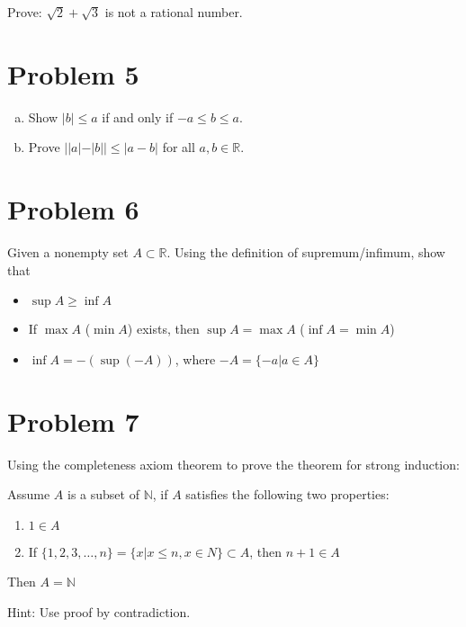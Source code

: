\documentclass[10pt]{article}
\begin{document}
    Prove: $\sqrt 2 + \sqrt 3$ is not a rational number.

    \pagebreak 
    \section*{Problem 5}
    \begin{enumerate}[(a)]
        \item Show $|b| \le a$ if and only if $-a \le b \le a$. 
        \item Prove $||a| - |b|| \le |a - b|$ for all $a, b \in \mathbb R$.
    \end{enumerate}

    \pagebreak

    \section*{Problem 6}

    Given a nonempty set $A \subset \mathbb R$. Using the definition of supremum/infimum, show that 

    \begin{itemize}
        \item $\sup A \ge \inf A$
        \item If $\max A$ ($\min A$) exists, then $\sup A = \max A$ ($\inf A = \min A$)
        \item $\inf A = -(\sup (-A))$, where $-A = \{ -a \vert a \in A\}$
    \end{itemize}

    \pagebreak

    \section*{Problem 7}

    Using the completeness axiom theorem to prove the theorem for strong induction:

    \begin{theorem}
        Assume $A$ is a subset of $\mathbb N$, if $A$ satisfies the following two properties: 

        \begin{enumerate}[(1)]
            \item $1 \in A$
            \item If $\{1, 2, 3, \dots, n\} = \{ x \vert x \le n, x \in N\} \subset A$, then $n+1 \in A$
        \end{enumerate}

        Then $A = \mathbb N$
    \end{theorem}

    Hint: Use proof by contradiction.
    
    
\end{document}
